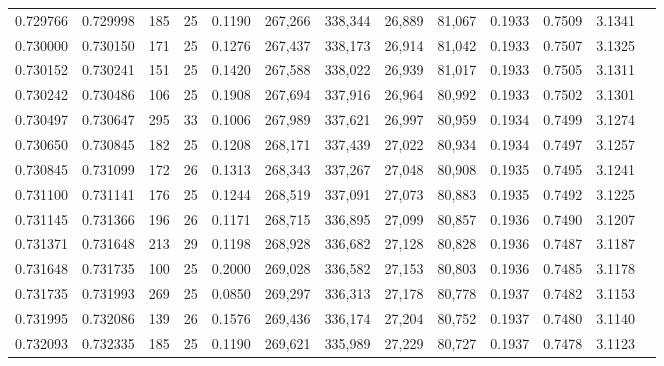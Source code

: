 \begin{tabular}{rrrrrrrrrrrrr}
0.729766 & 0.729998 &   185 &  25 &                                     0.1190 & 267,266 & 338,344 &  26,889 &  81,067 & 0.1933 & 0.7509 & 3.1341 \\
0.730000 & 0.730150 &   171 &  25 &                                     0.1276 & 267,437 & 338,173 &  26,914 &  81,042 & 0.1933 & 0.7507 & 3.1325 \\
0.730152 & 0.730241 &   151 &  25 &                                     0.1420 & 267,588 & 338,022 &  26,939 &  81,017 & 0.1933 & 0.7505 & 3.1311 \\
0.730242 & 0.730486 &   106 &  25 &                                     0.1908 & 267,694 & 337,916 &  26,964 &  80,992 & 0.1933 & 0.7502 & 3.1301 \\
0.730497 & 0.730647 &   295 &  33 &                                     0.1006 & 267,989 & 337,621 &  26,997 &  80,959 & 0.1934 & 0.7499 & 3.1274 \\
0.730650 & 0.730845 &   182 &  25 &                                     0.1208 & 268,171 & 337,439 &  27,022 &  80,934 & 0.1934 & 0.7497 & 3.1257 \\
0.730845 & 0.731099 &   172 &  26 &                                     0.1313 & 268,343 & 337,267 &  27,048 &  80,908 & 0.1935 & 0.7495 & 3.1241 \\
0.731100 & 0.731141 &   176 &  25 &                                     0.1244 & 268,519 & 337,091 &  27,073 &  80,883 & 0.1935 & 0.7492 & 3.1225 \\
0.731145 & 0.731366 &   196 &  26 &                                     0.1171 & 268,715 & 336,895 &  27,099 &  80,857 & 0.1936 & 0.7490 & 3.1207 \\
0.731371 & 0.731648 &   213 &  29 &                                     0.1198 & 268,928 & 336,682 &  27,128 &  80,828 & 0.1936 & 0.7487 & 3.1187 \\
0.731648 & 0.731735 &   100 &  25 &                                     0.2000 & 269,028 & 336,582 &  27,153 &  80,803 & 0.1936 & 0.7485 & 3.1178 \\
0.731735 & 0.731993 &   269 &  25 &                                     0.0850 & 269,297 & 336,313 &  27,178 &  80,778 & 0.1937 & 0.7482 & 3.1153 \\
0.731995 & 0.732086 &   139 &  26 &                                     0.1576 & 269,436 & 336,174 &  27,204 &  80,752 & 0.1937 & 0.7480 & 3.1140 \\
0.732093 & 0.732335 &   185 &  25 &                                     0.1190 & 269,621 & 335,989 &  27,229 &  80,727 & 0.1937 & 0.7478 & 3.1123 \\

\end{tabular}
